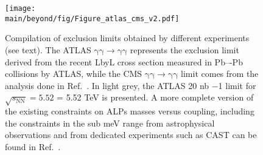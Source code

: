 \begin{figure}[!htbp]
\centering
  \texttt{[image: \\main/beyond/fig/Figure\_atlas\_cms\_v2.pdf]}
  \caption{Compilation of exclusion limits obtained by different experiments (see text). The ATLAS $\mathrm{\gamma\gamma\rightarrow\gamma\gamma}$ represents the exclusion limit derived from the recent LbyL cross section measured in Pb–-Pb collisions by ATLAS, while the CMS $\mathrm{\gamma\gamma\rightarrow\gamma\gamma}$ limit comes from the analysis done in Ref.~\cite{Sirunyan:2018fhl}. In light grey, the ATLAS 20 nb −1 limit for $\sqrt{s_{\mathrm{NN}}}=5.52$ = 5.52 TeV is presented. A more complete version of the existing constraints on ALPs masses versus coupling, including the constraints in the sub meV range from astrophysical observations and from dedicated experiments such as CAST can be found in Ref.~\cite{Bauer:2017ris}.}
  \label{fig:alp-lambda-limits-cms}
\end{figure}



